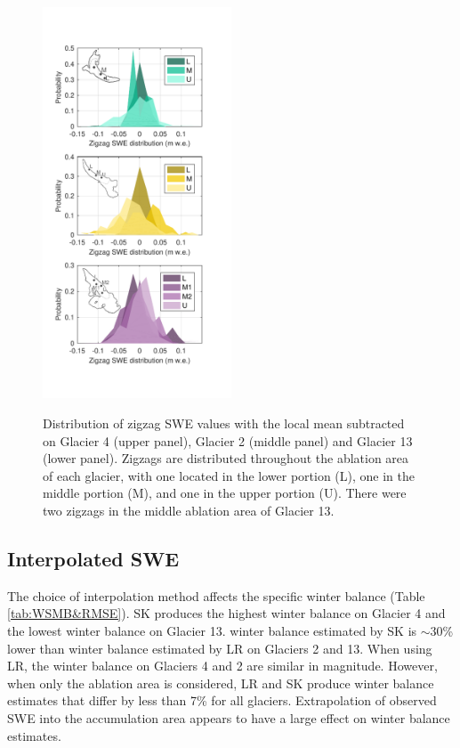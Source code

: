 \documentclass[review,oneside, letterpaper]{igs}
\begin{document}
\begin{figure}
	\centering
	\includegraphics[width =0.5\textwidth]{ZigzagHistogram.pdf}\\
	\caption{Distribution of zigzag SWE values with the local mean subtracted on Glacier 4 (upper panel), Glacier 2 (middle panel) and Glacier 13 (lower panel). Zigzags are distributed throughout the ablation area of each glacier, with one located in the lower portion (L), one in the middle portion (M), and one in the upper portion (U). There were two zigzags in the middle ablation area of Glacier 13.}
	\label{fig:ZigzagHistogram}
\end{figure}

\subsection{Interpolated SWE}
 
The choice of interpolation method affects the specific winter balance (Table \ref{tab:WSMB&RMSE}). SK produces the highest winter balance on Glacier 4 and the lowest winter balance on Glacier 13. winter balance estimated by SK is $\sim$30\% lower than winter balance estimated by LR on Glaciers 2 and 13. When using LR, the winter balance on Glaciers 4 and 2 are similar in magnitude. However, when only the ablation area is considered, LR and SK produce winter balance estimates that differ by less than 7\% for all glaciers. Extrapolation of observed SWE into the accumulation area appears to have a large effect on winter balance estimates. 
\end{document}
